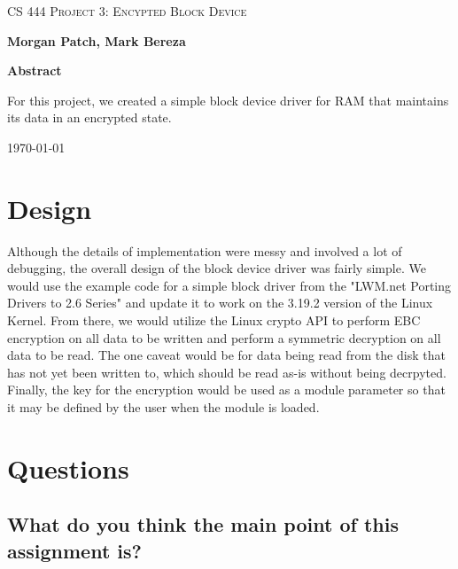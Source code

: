 \documentclass[letterpaper,10pt,titlepage,draftclsnofoot,onecolumn]{article}
\def\name{Morgan Patch, Mark Bereza}
\def\subj{CS 444 Project 3: Encypted Block Device}
\begin{document}
\begin{titlepage}
	\centering
	{\scshape\huge \subj \par}
	\vspace{1.5cm}
	{\LARGE\bfseries \name\par}

	\vfill
	
	{\large\bfseries Abstract\par}
	\vspace{0.5cm}
	
	For this project, we created a simple block device driver for RAM that maintains its data in an encrypted state.
	
	\vfill
	{\large \today\par}
\end{titlepage}

\tableofcontents
\newpage

\section{Design}

Although the details of implementation were messy and involved a lot of debugging, the overall design of the block device driver was fairly simple. We would use the example code for a simple block driver from the "LWM.net Porting Drivers to 2.6 Series" and update it to work on the 3.19.2 version of the Linux Kernel. From there, we would utilize the Linux crypto API to perform EBC encryption on all data to be written and perform a symmetric decryption on all data to be read. The one caveat would be for data being read from the disk that has not yet been written to, which should be read as-is without being decrpyted. Finally, the key for the encryption would be used as a module parameter so that it may be defined by the user when the module is loaded.

\section{Questions}

\subsection{What do you think the main point of this assignment is?}
\end{document}
